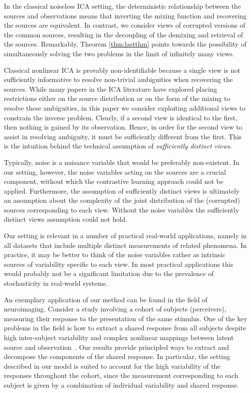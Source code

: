 In the classical noiseless ICA setting, the deterministic relationship between the sources and observations means that inverting the mixing function and recovering the sources are equivalent.
In contrast, we consider views of corrupted versions of the common sources, resulting in the decoupling of the demixing and retrieval of the sources.
Remarkably, Theorem \ref{thm:lastthm} points towards the possibility of simultaneously solving the two problems in the limit of infinitely many views.

Classical nonlinear ICA is provably non-identifiable because a single view is not sufficiently informative to resolve non-trivial ambiguities when recovering the sources.
While many papers in the ICA literature have explored placing restrictions either on the source distribution or on the form of the mixing to resolve these ambiguities, in this paper we consider exploiting additional views to constrain the inverse problem.
Clearly, if a second view is identical to the first, then nothing is gained by its observation.
Hence, in order for the second view to assist in resolving ambiguity, it must be sufficiently different from the first.
This is the intuition behind the technical assumption of \emph{sufficiently distinct views}.


Typically, noise is a nuisance variable that would be preferably non-existent.
In our setting, however, the noise variables acting on the sources are a crucial component, without which the contrastive learning approach could not be applied.
Furthermore, the assumption of sufficiently distinct views is ultimately an assumption about the complexity of the joint distribution of the (corrupted) sources corresponding to each view.
Without the noise variables the sufficiently distinct views assumption could not hold.


Our setting is relevant in a number of practical real-world applications, namely in all datasets that include multiple distinct measurements of related phenomena.
In practice, it may be better to think of the noise variables rather as intrinsic sources of variability specific to each view.
In most practical applications this would probably not be a significant limitation due to the prevalence of stochasticity in real-world systems.

An exemplary application of our method can be found in the field of neuroimaging.
Consider a study involving a cohort of subjects (perceivers), measuring their response to the presentation of the same stimulus.
One of the key problems in the field is how to extract a shared response from all subjects despite high inter-subject variability and complex nonlinear mappings between latent source and observation~\cite{chen2015reduced, haxby2011common}.
Our results provide principled ways to extract and decompose the components of the shared response.
In particular, the setting described in our model is suited to account for the high variability of the responses throughout the cohort, since the measurement corresponding to each subject is given by a combination of individual variability and shared response.

